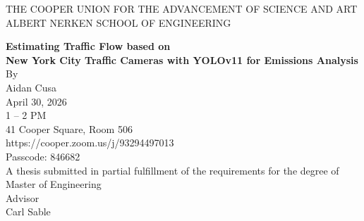 \begin{titlepage}
    \centering
    {THE COOPER UNION FOR THE ADVANCEMENT OF SCIENCE AND ART}\\
    {ALBERT NERKEN SCHOOL OF ENGINEERING}
    \vspace*{1.75in}

    {\Huge \textbf{Estimating Traffic Flow based on\\New York City Traffic Cameras with YOLOv11 for Emissions Analysis}}\\[1em]
    {\normalsize By}\\[0.75em]
    {\large Aidan Cusa}\\[6em]


    {April 30, 2026}\\
    {1 -- 2 PM}\\
    {41 Cooper Square, Room 506}\\[0.5em]
    {\small https://cooper.zoom.us/j/93294497013}\\
    {\small Passcode: 846682}\\[3em]

    {A thesis submitted in partial fulfillment of the requirements for the degree of}\\
    {Master of Engineering}\\[2em]

    {Advisor}\\[1em]
    {Carl Sable}
\end{titlepage}

